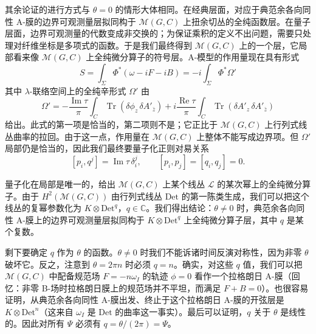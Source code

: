 \documentclass[11pt,a4paper,UTF8]{ctexart}
\begin{document}
其余论证的进行方式与 $\theta=0$ 的情形大体相同。在经典层面，对应于典范余各向同性 A-膜的边界可观测量层拟同构于 $\mathcal{M}(G,C)$ 上扭余切丛的全纯函数层。在量子层面，边界可观测量的代数变成非交换的；为保证乘积的定义不出问题，需要只处理对纤维坐标是多项式的函数。于是我们最终得到 $\mathcal{M}(G,C)$ 上的一个层，它局部看来像 $\mathcal{M}(G,C)$ 上全纯微分算子的符号层。A-模型的作用量现在具有形式
\[
    S=\int_{\Sigma}\Phi^{*}(\omega-iF-iB)=-i\int_{\Sigma}\Phi^{*}\Omega'
\]
其中 $\lambda$-联络空间上的全纯辛形式 $\Omega'$ 由
\[
    \Omega'=-\frac{\operatorname{Im}\tau}{\pi}\int_{C}\operatorname{Tr}\left(\delta\phi_{z}\,\delta A'_{\bar z}\right)
    +i\frac{\operatorname{Re}\tau}{\pi}\int_{C}\operatorname{Tr}\left(\delta A'_{z}\,\delta A'_{\bar z}\right)
\]
给出。此式的第一项是恰当的，第二项则不是；它正比于 $\mathcal{M}(G,C)$ 上行列式线丛曲率的拉回。由于这一点，作用量在 $\mathcal{M}(G,C)$ 上整体不能写成边界项。但 $\Omega'$ 局部仍是恰当的，因此我们最终要量子化正则对易关系
\[
    [p_{i},q^{j}]=\operatorname{Im}\tau\,\delta^{j}_{i},\qquad
    [p_{i},p_{j}]=[q_{i},q_{j}]=0.
\]


量子化在局部是唯一的，给出 $\mathcal{M}(G,C)$ 上某个线丛 $\mathcal{L}$ 的某次幂上的全纯微分算子。由于 $H^{2}(\mathcal{M}(G,C))$ 由行列式线丛 $\mathrm{Det}$ 的第一陈类生成，我们可以把这个线丛的复幂参数化为 $K\otimes\mathrm{Det}^{q}$，$q\in\mathbb{C}$。我们得出结论：$\theta\neq 0$ 时，典范余各向同性 A-膜上的边界可观测量层拟同构于 $K\otimes\mathrm{Det}^{q}$ 上全纯微分算子层，其中 $q$ 是某个复数。



剩下要确定 $q$ 作为 $\theta$ 的函数。$\theta\neq 0$ 时我们不能诉诸时间反演对称性，因为非零 $\theta$ 破坏它。反之，注意到 $\theta=2\pi n$ 时必须 $q=n$。确实，对这些 $q$ 值，我们可以把 $\mathcal{M}(G,C)$ 中配备规范场 $F=-n\omega_{I}$ 的轨迹 $\phi=0$ 看作一个拉格朗日 A-膜（回忆：非零 B-场时拉格朗日膜上的规范场并不平坦，而满足 $F+B=0$）。也很容易证明，从典范余各向同性 A-膜出发、终止于这个拉格朗日 A-膜的开弦层是 $K\otimes\mathrm{Det}^{n}$（这来自 $\omega_{I}$ 是 $\mathrm{Det}$ 的曲率这一事实）。最后可以证明，$q$ 关于 $\theta$ 是线性的。因此对所有 $\Psi$ 必须有 $q=\theta/(2\pi)=\Psi$。
\end{document}
